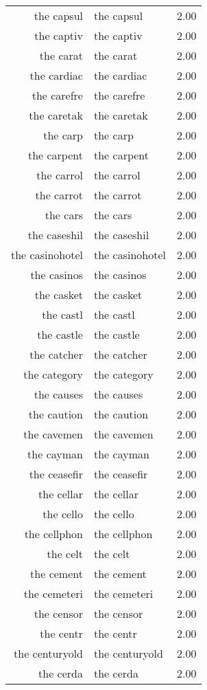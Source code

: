 \begin{table}[ht]
\begin{tabular}{rlr}
  the capsul & the capsul & 2.00 \\ 
  the captiv & the captiv & 2.00 \\ 
  the carat & the carat & 2.00 \\ 
  the cardiac & the cardiac & 2.00 \\ 
  the carefre & the carefre & 2.00 \\ 
  the caretak & the caretak & 2.00 \\ 
  the carp & the carp & 2.00 \\ 
  the carpent & the carpent & 2.00 \\ 
  the carrol & the carrol & 2.00 \\ 
  the carrot & the carrot & 2.00 \\ 
  the cars & the cars & 2.00 \\ 
  the caseshil & the caseshil & 2.00 \\ 
  the casinohotel & the casinohotel & 2.00 \\ 
  the casinos & the casinos & 2.00 \\ 
  the casket & the casket & 2.00 \\ 
  the castl & the castl & 2.00 \\ 
  the castle & the castle & 2.00 \\ 
  the catcher & the catcher & 2.00 \\ 
  the category & the category & 2.00 \\ 
  the causes & the causes & 2.00 \\ 
  the caution & the caution & 2.00 \\ 
  the cavemen & the cavemen & 2.00 \\ 
  the cayman & the cayman & 2.00 \\ 
  the ceasefir & the ceasefir & 2.00 \\ 
  the cellar & the cellar & 2.00 \\ 
  the cello & the cello & 2.00 \\ 
  the cellphon & the cellphon & 2.00 \\ 
  the celt & the celt & 2.00 \\ 
  the cement & the cement & 2.00 \\ 
  the cemeteri & the cemeteri & 2.00 \\ 
  the censor & the censor & 2.00 \\ 
  the centr & the centr & 2.00 \\ 
  the centuryold & the centuryold & 2.00 \\ 
  the cerda & the cerda & 2.00 \\ 

\end{tabular}
\end{table}
